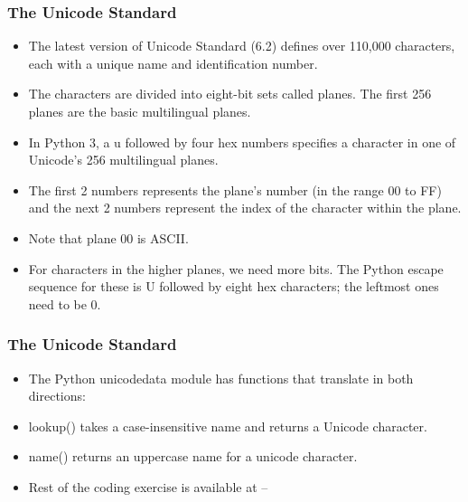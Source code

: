\documentclass{beamer}
\begin{document}
\begin{frame}
\frametitle{The Unicode Standard}
\begin{itemize}
\item The latest version of Unicode Standard (6.2) defines over 110,000 characters, each with a unique name and identification number. 
\item The characters are divided into eight-bit sets called planes. The first 256 planes are the basic multilingual planes.
\item In Python 3, a u followed by four hex numbers specifies a character in one of Unicode's 256 multilingual planes.
\item The first 2 numbers represents the plane's number (in the range 00 to FF) and the next 2 numbers represent the index of the character within the plane.
\item Note that plane 00 is ASCII.
\item For characters in the higher planes, we need more bits. The Python escape sequence for these is U followed by eight hex characters; the leftmost ones need to be 0.

\end{itemize}
\end{frame}


\begin{frame}
\frametitle{The Unicode Standard}
\begin{itemize}
\item The Python unicodedata module has functions that translate in both directions:
\item lookup() takes a case-insensitive name and returns a Unicode character.
\item name() returns an uppercase name for a unicode character.
\item Rest of the coding exercise is available at -- 
\end{itemize}
\end{frame}
\end{document}
